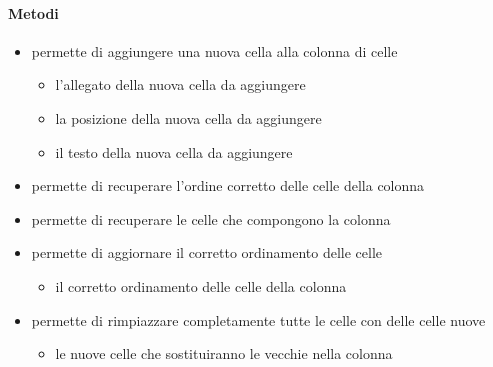 \paragraph{Metodi}
\begin{itemize}
\item {}
\newline
permette di aggiungere una nuova cella alla colonna di celle
\newline
{}
\newline
\begin{itemize}
\item {}
\newline
l'allegato della nuova cella da aggiungere
\item {}
\newline
la posizione della nuova cella da aggiungere
\item {}
\newline
il testo della nuova cella da aggiungere
\end{itemize}
\item {}
\newline
permette di recuperare l'ordine corretto delle celle della colonna
\newline
\item {}
\newline
permette di recuperare le celle che compongono la colonna
\newline
\item {}
\newline
permette di aggiornare il corretto ordinamento delle celle
\newline
{}
\newline
\begin{itemize}
\item {}
\newline
il corretto ordinamento delle celle della colonna
\end{itemize}
\item {}
\newline
permette di rimpiazzare completamente tutte le celle con delle celle nuove
\newline
{}
\newline
\begin{itemize}
\item {}
\newline
le nuove celle che sostituiranno le vecchie nella colonna
\end{itemize}
\end{itemize}
